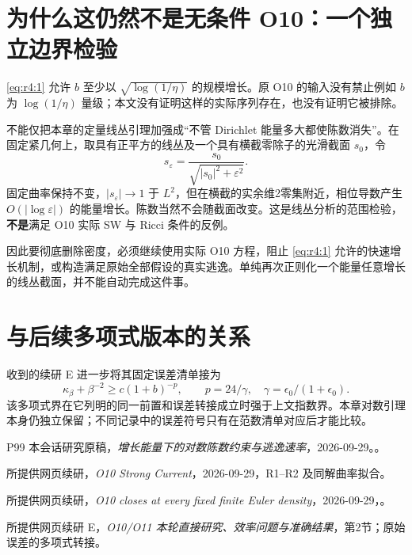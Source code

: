 \documentclass[UTF8,11pt,fontset=none]{ctexart}
\begin{document}
\section{为什么这仍然不是无条件 O10：一个独立边界检验}\label{ch4:ux4e3aux4ec0ux4e48ux8fd9ux4ecdux7136ux4e0dux662fux65e0ux6761ux4ef6-o10ux4e00ux4e2aux72ecux7acbux8fb9ux754cux68c0ux9a8c}

\eqref{eq:r4:1} 允许 \(b\) 至少以 \(\sqrt{\log(1/\eta)}\) 的规模增长。原 O10 的输入没有禁止例如 \(b\) 为 \(\log(1/\eta)\) 量级；本文没有证明这样的实际序列存在，也没有证明它被排除。

不能仅把本章的定量线丛引理加强成``不管 Dirichlet 能量多大都使陈数消失''。在固定紧几何上，取具有正平方的线丛及一个具有横截零除子的光滑截面 \(s_0\)，令 \[
s_\varepsilon=\frac{s_0}{\sqrt{|s_0|^2+\varepsilon^2}}.
\] 固定曲率保持不变，\(|s_\varepsilon|\to1\) 于 \(L^2\)，但在横截的实余维2零集附近，相位导数产生 \(O(|\log\varepsilon|)\) 的能量增长。陈数当然不会随截面改变。这是线丛分析的范围检验，\textbf{不是}满足 O10 实际 SW 与 Ricci 条件的反例。

因此要彻底删除密度，必须继续使用实际 O10 方程，阻止 \eqref{eq:r4:1} 允许的快速增长机制，或构造满足原始全部假设的真实逃逸。单纯再次正则化一个能量任意增长的线丛截面，并不能自动完成这件事。

\section{与后续多项式版本的关系}\label{ch4:ux4e0eux540eux7eedux591aux9879ux5f0fux7248ux672cux7684ux5173ux7cfb}

收到的续研 E 进一步将其固定误差清单接为 \[
\kappa_\beta+\beta^{-2}\ge c(1+b)^{-p},
\qquad p=24/\gamma,\quad\gamma=\epsilon_0/(1+\epsilon_0).
\] 该多项式界在它列明的同一前置和误差转接成立时强于上文指数界。本章对数引理本身仍独立保留；不同记录中的误差符号只有在范数清单对应后才能比较。\cite{WeightedReport}

\begin{thebibliography}{P99}
\small
{} 本会话研究原稿，\emph{增长能量下的对数陈数约束与逃逸速率}，2026-09-29。。

 所提供网页续研，\emph{O10 Strong Current}，2026-09-29，R1--R2 及同解曲率拟合。

 所提供网页续研，\emph{O10 closes at every fixed finite Euler density}，2026-09-29，。

 所提供网页续研 E，\emph{O10/O11 本轮直接研究、效率问题与准确结果}，第2节；原始误差的多项式转接。

\end{thebibliography}
\end{document}

